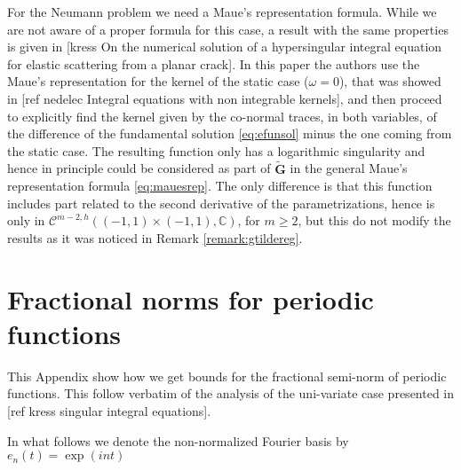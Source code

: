 \documentclass{article}
\newcommand{\todo}[1]{{\color{red}[#1]}}
\newcommand{\IC}{{\mathbb C}}
\newcommand{\cmspaceh}[4]{\mathcal{C}^{#1,#2} \left( #3, #4 \right)}
\newcommand{\iinterv}{(-1,1)\times(-1,1)}
\begin{document}
For the Neumann problem we need a Maue's representation formula. While we are not aware of a proper formula for this case, a result with the same properties is given in \todo{kress On the numerical solution of a hypersingular integral equation for elastic scattering from a planar crack}. In this paper the authors use the Maue's representation for the kernel of the static case ($\omega = 0$), that was showed in \todo{ref nedelec Integral equations with non integrable kernels}, and then proceed to explicitly find the kernel given by the co-normal traces, in both variables, of the difference of the fundamental solution \eqref{eq:efunsol}  minus the one coming from the static case. The resulting function only has a logarithmic singularity and hence in principle could be considered as part of $\widetilde{\mathbf{G}}$ in the general Maue's representation formula \eqref{eq:mauesrep}. The only difference is that this function includes part related to the second derivative of the parametrizations, hence is only in $\cmspaceh{m-2}{h}{\iinterv}{\IC}$, for $m\geq 2$, but this do not modify the results as it was noticed in Remark \ref{remark:gtildereg}. 




\appendix
\section{Fractional norms for periodic functions}
\label{appendix:fracbivariate}
This Appendix show how we get bounds for the fractional semi-norm of periodic functions. This follow verbatim of the analysis of the uni-variate case presented in \todo{ref kress singular integral equations}. 

In what follows we denote the non-normalized Fourier basis by $e_n(t) = \exp{(i n t) }$
\end{document}
